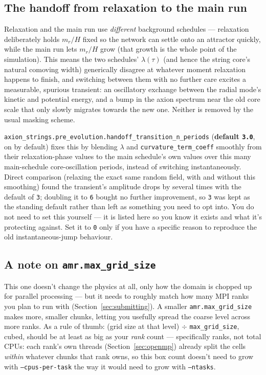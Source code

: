 \documentclass[11pt]{article}
\begin{document}
\subsection{The handoff from relaxation to the main run}
\label{sec:handoff-smoothing}

Relaxation and the main run use \emph{different} background schedules --- relaxation deliberately holds
$m_r/H$ fixed so the network can settle onto an attractor quickly, while the main run lets $m_r/H$ grow (that
growth is the whole point of the simulation). This means the two schedules' $\lambda(\tau)$ (and hence the
string core's natural comoving width) generically disagree at whatever moment relaxation happens to finish,
and switching between them with no further care excites a measurable, spurious transient: an oscillatory
exchange between the radial mode's kinetic and potential energy, and a bump in the axion spectrum near the
old core scale that only slowly migrates towards the new one. Neither is removed by the usual masking
scheme.

\texttt{axion\_strings.pre\_evolution.handoff\_transition\_n\_periods} (\textbf{default \texttt{3.0}}, on by
default) fixes this by blending $\lambda$ and \texttt{curvature\_term\_coeff} smoothly from their
relaxation-phase values to the main schedule's own values over this many main-schedule core-oscillation
periods, instead of switching instantaneously. Direct comparison (relaxing the exact same random field, with
and without this smoothing) found the transient's amplitude drops by several times with the default of
\texttt{3}; doubling it to \texttt{6} bought no further improvement, so \texttt{3} was kept as the standing
default rather than left as something you need to opt into. You do not need to set this yourself --- it is
listed here so you know it exists and what it's protecting against. Set it to \texttt{0} only if you have a
specific reason to reproduce the old instantaneous-jump behaviour.

\subsection{A note on \texttt{amr.max\_grid\_size}}

This one doesn't change the physics at all, only how the domain is chopped up for parallel processing ---
but it needs to roughly match how many MPI ranks you plan to run with (Section~\ref{sec:submitting}). A
smaller \texttt{amr.max\_grid\_size} makes more, smaller chunks, letting you usefully spread the coarse
level across more ranks. As a rule of thumb: (grid size at that level) $\div$ \texttt{max\_grid\_size},
cubed, should be at least as big as your \emph{rank} count --- specifically ranks, not total CPUs: each
rank's own threads (Section~\ref{sec:openmp}) already split the cells \emph{within} whatever chunks that
rank owns, so this box count doesn't need to grow with \texttt{--cpus-per-task} the way it would need to
grow with \texttt{--ntasks}.
\end{document}
